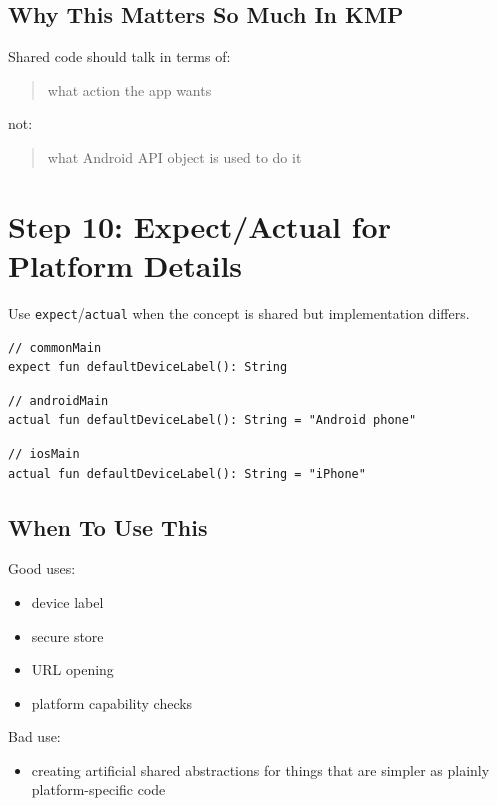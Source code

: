 \documentclass[11pt,a4paper]{article}
\begin{document}
\subsection{Why This Matters So Much In KMP}

Shared code should talk in terms of:
\begin{quote}
what action the app wants
\end{quote}

not:
\begin{quote}
what Android API object is used to do it
\end{quote}

\section{Step 10: Expect/Actual for Platform Details}

Use \texttt{expect}/\texttt{actual} when the concept is shared but implementation differs.

\begin{lstlisting}[style=kazekotlin]
// commonMain
expect fun defaultDeviceLabel(): String
\end{lstlisting}

\begin{lstlisting}[style=kazekotlin]
// androidMain
actual fun defaultDeviceLabel(): String = "Android phone"
\end{lstlisting}

\begin{lstlisting}[style=kazekotlin]
// iosMain
actual fun defaultDeviceLabel(): String = "iPhone"
\end{lstlisting}

\subsection{When To Use This}

Good uses:
\begin{itemize}
    \item device label
    \item secure store
    \item URL opening
    \item platform capability checks
\end{itemize}

Bad use:
\begin{itemize}
    \item creating artificial shared abstractions for things that are simpler as plainly platform-specific code
\end{itemize}
\end{document}
